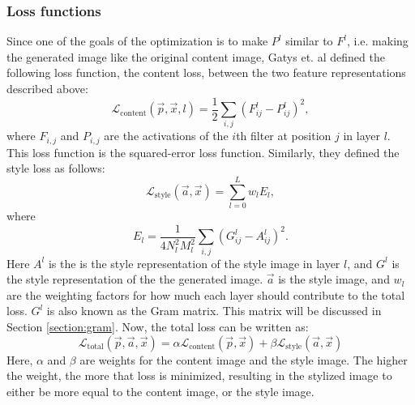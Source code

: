\subsubsection{Loss functions}
Since one of the goals of the optimization is to make $P^l$ similar to $F^l$, i.e. making the generated image like the original content image, Gatys et. al defined the following loss function, the content loss, between the two feature representations described above:
\begin{equation}
\label{eq:content_loss}
    \mathcal{L}_\text{content}(\vec{p},\vec{x},l)=\frac{1}{2}\sum_{i,j}{(F_{ij}^l-P_{ij}^l)^2},
\end{equation}
where $F_{i,j}$ and $P_{i,j}$ are the activations of the $i$th filter at position $j$ in layer $l$. This loss function is the squared-error loss function. Similarly, they defined the style loss as follows:
\begin{equation}
\label{eq:style_loss}
    \mathcal{L}_\text{style}(\vec{a},\vec{x})=\sum_{l=0}^L{w_lE_l},
\end{equation}
where
\begin{equation}
    E_l=\frac{1}{4N_l^2M_l^2}\sum_{i,j}{(G_{ij}^l-A_{ij}^l)^2}.
\end{equation}
Here $A^l$ is the is the style representation of the style image in layer $l$, and $G^l$ is the style representation of the the generated image. $\vec{a}$ is the style image, and $w_l$ are the weighting factors for how much each layer should contribute to the total loss. $G^l$ is also known as the Gram matrix. This matrix will be discussed in Section \ref{section:gram}. Now, the total loss can be written as:
\begin{equation}
\label{eq:total_loss}
    \mathcal{L}_\text{total}(\vec{p}, \vec{a}, \vec{x})=\alpha\mathcal{L}_\text{content}(\vec{p},\vec{x})+\beta\mathcal{L}_\text{style}(\vec{a},\vec{x})
\end{equation}
Here, $\alpha$ and $\beta$ are weights for the content image and the style image. The higher the weight, the more that loss is minimized, resulting in the stylized image to either be more equal to the content image, or the style image.
